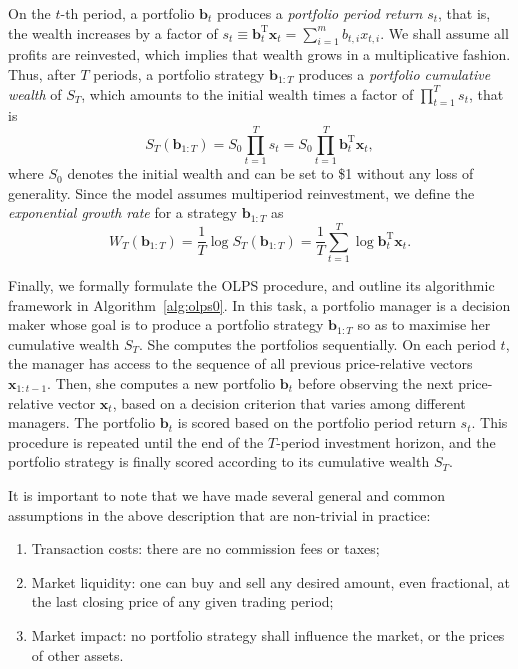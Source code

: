 On the $t$-th period, a portfolio $\mathbf{b}_t$ produces a \emph{portfolio period return} $s_t$, that is, the wealth increases by a factor of $s_t \equiv \mathbf{b}_t^\text{T}\mathbf{x}_t = \sum_{i=1}^m b_{t,i}x_{t,i}$. We shall assume all profits are reinvested, which implies that wealth grows in a multiplicative fashion. Thus, after $T$ periods, a portfolio strategy $\mathbf{b}_{1:T}$ produces a \emph{portfolio cumulative wealth} of $S_T$, which amounts to the initial wealth times a factor of $\prod_{t=1}^T s_t$, that is
\begin{equation}
\label{eq:portfolio-cumulative-wealth}
	S_T(\mathbf{b}_{1:T})
	= S_0\prod_{t=1}^T s_t
	= S_0\prod_{t=1}^T \mathbf{b}_t^\text{T}\mathbf{x}_t,
\end{equation}
where $S_0$ denotes the initial wealth and can be set to \$1 without any loss of generality. Since the model assumes multiperiod reinvestment, we define the \emph{exponential growth rate} for a strategy $\mathbf{b}_{1:T}$ as
\begin{equation}
	W_{T}(\mathbf{b}_{1:T})
	= \frac{1}{T}\log S_T(\mathbf{b}_{1:T})
	= \frac{1}{T}\sum_{t=1}^T \log \mathbf{b}_t^\text{T}\mathbf{x}_t.
\end{equation}

Finally, we formally formulate the OLPS procedure, and outline its algorithmic framework in Algorithm~\ref{alg:olps0}. In this task, a portfolio manager is a decision maker whose goal is to produce a portfolio strategy $\mathbf{b}_{1:T}$ so as to maximise her cumulative wealth $S_T$. She computes the portfolios sequentially. On each period $t$, the manager has access to the sequence of all previous price-relative vectors $\mathbf{x}_{1:t-1}$. Then, she computes a new portfolio $\mathbf{b}_t$ before observing the next price-relative vector $\mathbf{x}_t$, based on a decision criterion that varies among different managers. The portfolio $\mathbf{b}_t$ is scored based on the portfolio period return $s_t$. This procedure is repeated until the end of the $T$-period investment horizon, and the portfolio strategy is finally scored according to its cumulative wealth $S_T$.

It is important to note that we have made several general and common assumptions in the above description that are non-trivial in practice:
\begin{enumerate}
  \item Transaction costs: there are no commission fees or taxes;
  \item Market liquidity: one can buy and sell any desired amount, even fractional, at the last closing price of any given trading period;
  \item Market impact: no portfolio strategy shall influence the market, or the prices of other assets.
\end{enumerate}

